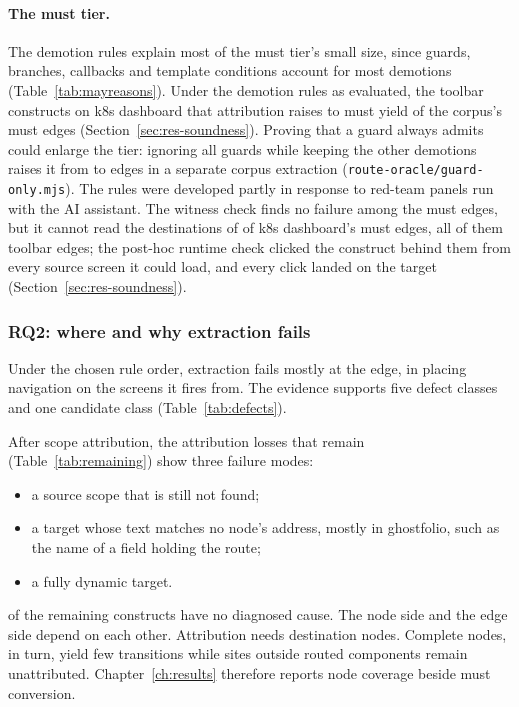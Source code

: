 \paragraph{The must tier.}
The demotion rules explain most of the must tier's small size, since guards, branches, callbacks and
template conditions account for most demotions (Table~\ref{tab:mayreasons}). Under the demotion rules as evaluated, the \CensusMustSitesKdash{} toolbar
constructs on k8s dashboard that attribution raises to must yield \CensusMustKdash{} of the corpus's \CensusMust{} must edges (Section~\ref{sec:res-soundness}). Proving that a guard
always admits could enlarge the tier: ignoring all guards while keeping the other demotions raises
it from \CensusMust{} to \GuardOnlyMust{} edges in a separate corpus extraction
(\texttt{route-oracle/guard-only.mjs}). The rules
were developed partly in response to red-team panels run with the AI assistant. The witness check
finds no failure among the must edges, but it cannot read the destinations of \MustWitnessUnread{} of k8s
dashboard's \CensusMustKdash{} must edges, all of them toolbar edges; the post-hoc runtime check clicked the construct
behind them from every source screen it could load, and every click landed on the target
(Section~\ref{sec:res-soundness}).

\subsubsection{RQ2: where and why extraction fails}
\label{sec:rq2}

Under the chosen rule order, extraction fails mostly at the edge, in placing navigation on the
screens it fires from. The
evidence supports five defect classes and one candidate class (Table~\ref{tab:defects}).

After scope attribution, the attribution losses that remain (Table~\ref{tab:remaining}) show three
failure modes:
\begin{itemize}
\item a source scope that is still not found;
\item a target whose text matches no node's address, mostly in ghostfolio, such as the name of a
field holding the route;
\item a fully dynamic target.
\end{itemize}
\AttrRemainingUnexplained{} of the \AttrRemaining{} remaining constructs have no diagnosed cause. The node side and the edge side depend on each other. Attribution needs destination
nodes. Complete nodes, in turn, yield few transitions while sites outside routed components remain
unattributed. Chapter~\ref{ch:results} therefore reports node coverage beside must conversion.

